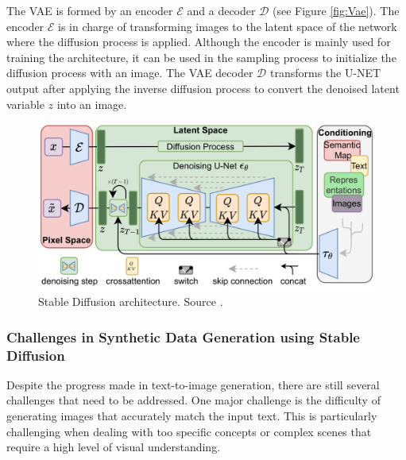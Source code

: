The VAE \cite{Kingma2014} is formed by an encoder $\mathcal{E}$ and a decoder $\mathcal{D}$ (see Figure \ref{fig:Vae}). The encoder $\mathcal{E}$ is in charge of transforming images to the latent space of the network where the diffusion process is applied. Although the encoder is mainly used for training the architecture, it can be used in the sampling process to initialize the diffusion process with an image. The VAE decoder $\mathcal{D}$ transforms the U-NET output after applying the inverse diffusion process to convert the denoised latent variable $z$ into an image.

\begin{figure}
    \centering
    \includegraphics[width=\columnwidth]{img/2-related-work/stable-diffusion-architecture.png}
    \caption[Stable Diffusion architecture]{Stable Diffusion architecture. Source \cite{rombach2022high}.}
    \label{fig:stable-diffusion}
\end{figure}


\subsubsection{Challenges in Synthetic Data Generation using Stable Diffusion}

Despite the progress made in text-to-image generation, there are still several challenges that need to be addressed. One major challenge is the difficulty of generating images that accurately match the input text. This is particularly challenging when dealing with too specific concepts or complex scenes that require a high level of visual understanding.

